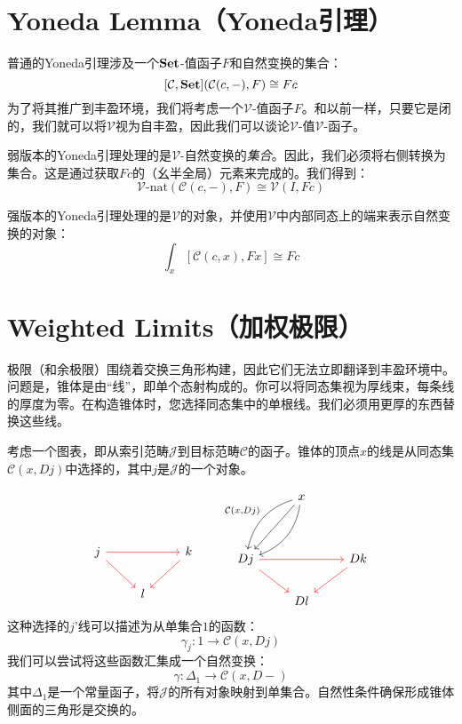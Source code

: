 \documentclass[DaoFP]{subfiles}
\begin{document}
 \section{Yoneda Lemma（Yoneda引理）}

 普通的Yoneda引理涉及一个$\mathbf{Set}$-值函子$F$和自然变换的集合：
 \[ [\mathcal C, \mathbf{Set}]( \mathcal C(c, -), F) \cong F c \]
 为了将其推广到丰盈环境，我们将考虑一个$\mathcal V$-值函子$F$。和以前一样，只要它是闭的，我们就可以将$\mathcal V$视为自丰盈，因此我们可以谈论$\mathcal V$-值$\mathcal V$-函子。

 弱版本的Yoneda引理处理的是$\mathcal V$-自然变换的\emph{集合}。因此，我们必须将右侧转换为集合。这是通过获取$F c$的（幺半全局）元素来完成的。我们得到：
 \[ \mathcal V\text{-nat} ( \mathcal C(c, -), F) \cong \mathcal V(I, F c) \]

 强版本的Yoneda引理处理的是$\mathcal V$的对象，并使用$\mathcal V$中内部同态上的端来表示自然变换的对象：
 \[ \int_x [\mathcal C( c, x), F x] \cong F c \]

 \section{Weighted Limits（加权极限）}

 极限（和余极限）围绕着交换三角形构建，因此它们无法立即翻译到丰盈环境中。问题是，锥体是由“线”，即单个态射构成的。你可以将同态集视为厚线束，每条线的厚度为零。在构造锥体时，您选择同态集中的单根线。我们必须用更厚的东西替换这些线。

 考虑一个图表，即从索引范畴$\mathcal J$到目标范畴$\mathcal C$的函子。锥体的顶点$x$的线是从同态集$\mathcal C(x, D j)$中选择的，其中$j$是$\mathcal J$的一个对象。

 \[
  \begin{tikzcd}
   \\
   \\
   j
   \arrow[rr, red]
   \arrow[rd, red]
   && k
   \arrow[dl, red]
   \\
   & l
  \end{tikzcd}
  \qquad
  \begin{tikzcd}
   & x
   \arrow[ddl, ""']
   \arrow[ddl, bend right, "{\mathcal C(x, D j)}"']
   \arrow[ddl, bend left, ""]
   \\
   \\
   D j
   \arrow[rr, red]
   \arrow[rd, red]
   && D k
   \arrow[dl, red]
   \\
   & D l
  \end{tikzcd}
 \]
 这种选择的$j$'线可以描述为从单集合$1$的函数：
 \[ \gamma_j \colon 1 \to \mathcal C(x, D j) \]
 我们可以尝试将这些函数汇集成一个自然变换：
 \[ \gamma \colon \Delta_1 \to \mathcal C(x, D -) \]
 其中$\Delta_1$是一个常量函子，将$\mathcal J$的所有对象映射到单集合。自然性条件确保形成锥体侧面的三角形是交换的。
\end{document}
